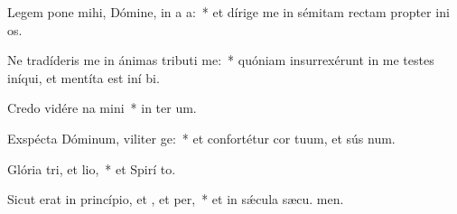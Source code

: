 \item Legem pone mihi, Dómine, in a a:~* et dírige me in sémitam rectam propter ini os.
\item Ne tradíderis me in ánimas tributi me:~* quóniam insurrexérunt in me testes iníqui, et mentíta est iní bi.
\item Credo vidére na mini~* in ter um.
\item Exspécta Dóminum, viliter ge:~* et confortétur cor tuum, et sús num.
\item Glória tri, et lio,~* et Spirí to.
\item Sicut erat in princípio, et , et per,~* et in sǽcula sæcu. men.
